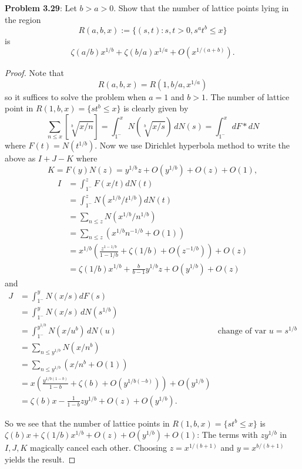 \documentclass[12pt]{article}
\begin{document}
\fi

\textbf{Problem 3.29}: Let $b > a > 0$. Show that the number of lattice points lying in the region 
$$R(a, b, x) := \{(s, t) : s, t > 0, s^a t^b \leq x\}$$
is
$$\zeta(a/b) x^{1/b} + \zeta(b/a) x^{1/a} + O(x^{1/(a+b)}).$$

\begin{proof}
Note that
$$R(a, b, x) = R(1, b/a, x^{1/a})$$
so it suffices to solve the problem when $a = 1$ and $b > 1$. The number of lattice point in $R(1, b, x) = \{s t^b \leq x\}$ is clearly given by
$$\sum_{n \leq x} [\sqrt[b]{x/n}] = \int_{1^-}^x N(\sqrt[b]{x/s}) \, dN(s) = \int_{1^-}^x dF * dN$$
where $F(t) = N(t^{1/b})$. Now we use Dirichlet hyperbola method to write the above as $I + J - K$ where
$$K = F(y) N(z) = y^{1/b} z + O(y^{1/b}) + O(z) + O(1),$$
\begin{align*}
I &= \int_{1^-}^z F(x/t) dN(t)\\
&= \int_{1^-}^z N(x^{1/b} / t^{1/b}) dN(t)\\
&= \sum_{n \leq z} N(x^{1/b} / n^{1/b})\\
&= \sum_{n \leq z} (x^{1/b} n^{-1/b} + O(1))\\
&= x^{1/b} \left( \frac{z^{1-1/b}}{1 - 1/b} + \zeta(1/b) + O(z^{-1/b}) \right) + O(z)\\
&= \zeta(1/b) x^{1/b} + \frac{b}{b - 1} y^{1/b} z + O(y^{1/b}) + O(z)
\end{align*}
and
\begin{align*}
J &= \int_{1^-}^y N(x/s) dF(s)\\
&= \int_{1^-}^y N(x/s) \, dN(s^{1/b})\\
&= \int_{1^-}^{y^{1/b}} N(x/u^b) \, dN(u) &\text{change of var } u = s^{1/b}\\
&= \sum_{n \leq y^{1/b}} N(x/n^b)\\
&= \sum_{n \leq y^{1/b}} (x/n^b + O(1))\\
&= x \left( \frac{y^{1/b(1-b)}}{1 - b} + \zeta(b) + O(y^{1/b(-b)}) \right) + O(y^{1/b})\\
&= \zeta(b) x - \frac{1}{1 - b} z y^{1/b} + O(z) + O(y^{1/b}).
\end{align*}

So we see that the number of lattice points in $R(1, b, x) = \{s t^b \leq x\}$ is $\zeta(b) x + \zeta(1/b) x^{1/b} + O(z) + O(y^{1/b}) + O(1)$: The terms with $z y^{1/b}$ in $I, J, K$ magically cancel each other. Choosing $z = x^{1/(b + 1)}$ and $y = x^{b/(b+1)}$ yields the result.
\end{proof}

\unless\ifdefined\IsMainDocument
\end{document}
